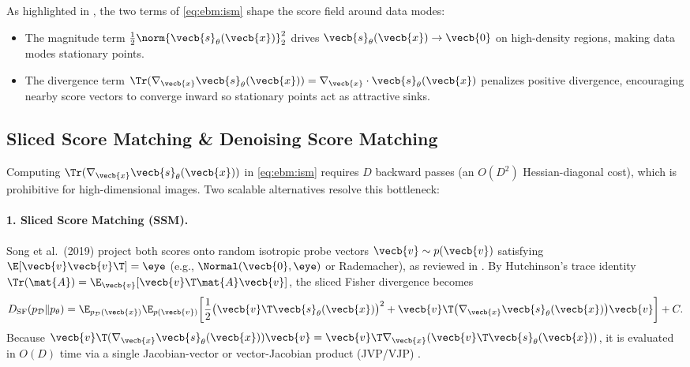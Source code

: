 \documentclass[../../../../master.tex]{subfiles}
\begin{document}
\begin{intuition}
As highlighted in , the two terms of \eqref{eq:ebm:ism} shape the score field around data modes:
\begin{itemize}
  \item The magnitude term $\frac{1}{2}\norm{\vecb{s}_\theta(\vecb{x})}_2^2$ drives $\vecb{s}_\theta(\vecb{x}) \to \vecb{0}$ on high-density regions, making data modes stationary points.
  \item The divergence term $\Tr(\nabla_{\vecb{x}}\vecb{s}_\theta(\vecb{x})) = \nabla_{\vecb{x}} \cdot \vecb{s}_\theta(\vecb{x})$ penalizes positive divergence, encouraging nearby score vectors to converge inward so stationary points act as attractive sinks.
\end{itemize}
\end{intuition}

\subsection{Sliced Score Matching \& Denoising Score Matching}
\label{sec:ebm:ssm_dsm}

Computing $\Tr(\nabla_{\vecb{x}}\vecb{s}_\theta(\vecb{x}))$ in \eqref{eq:ebm:ism} requires $D$ backward passes (an $O(D^2)$ Hessian-diagonal cost), which is prohibitive for high-dimensional images. Two scalable alternatives resolve this bottleneck:

\paragraph{1. Sliced Score Matching (SSM).}
Song et al.\ (2019) project both scores onto random isotropic probe vectors $\vecb{v} \sim p(\vecb{v})$ satisfying $\E[\vecb{v}\vecb{v}\T] = \eye$ (e.g., $\Normal(\vecb{0},\eye)$ or Rademacher), as reviewed in . By Hutchinson's trace identity $\Tr(\mat{A}) = \E_{\vecb{v}}[\vecb{v}\T \mat{A} \vecb{v}]$, the sliced Fisher divergence becomes
\begin{equation}
  D_{\mathrm{SF}}(p_{\mathcal{D}} \| p_\theta) = \E_{p_{\mathcal{D}}(\vecb{x})} \E_{p(\vecb{v})}\!\left[\frac{1}{2}\bigl(\vecb{v}\T \vecb{s}_\theta(\vecb{x})\bigr)^2 + \vecb{v}\T \bigl(\nabla_{\vecb{x}}\vecb{s}_\theta(\vecb{x})\bigr)\vecb{v}\right] + C.
  \label{eq:ebm:ssm}
\end{equation}
Because $\vecb{v}\T (\nabla_{\vecb{x}}\vecb{s}_\theta(\vecb{x})) \vecb{v} = \vecb{v}\T \nabla_{\vecb{x}}(\vecb{v}\T \vecb{s}_\theta(\vecb{x}))$, it is evaluated in $O(D)$ time via a single Jacobian-vector or vector-Jacobian product (JVP/VJP) .
\end{document}
